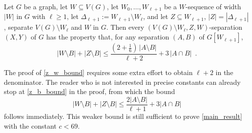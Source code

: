 \documentclass{patmorin}
\newcommand{\pat}[1]{\textcolor{Blue}{[Pat: #1]}}
\begin{document}
\begin{lem}\label{z_w_bound}
  Let $G$ be a graph, let $W\subseteq V(G)$, let $W_0,\ldots,W_{\ell+1}$ be a $W$-sequence of width $|W|$ in $G$ with $\ell\ge 1$, let $\Delta_{\ell+1}:=W_{\ell+1}\setminus W_{\ell}$,  and let $Z\subseteq W_{\ell+1}$, $|Z|=|\Delta_{\ell+1}|$, separate $V(G)\setminus W_{\ell}$ and $W$ in $G$.
  Then every $(V(G)\setminus W_{\ell},Z,W)$-separation $(X,Y)$ of $G$ has the property that, for any separation
  $(A,B)$ of $G[W_{\ell+1}]$,
  \[
    |W\setminus B|+|Z\setminus B|\le \frac{(2+\tfrac{1}{6})\,|A\setminus B|}{\ell+2}+3\,|A\cap B| \enspace .
  \]
\end{lem}


\begin{rem}\label{easier_path}
  The proof of \cref{z_w_bound} requires some extra effort to obtain $\ell+2$ in the denominator. The reader who is not interested in precise constants can already stop at \cref{z_b_bound} in the proof, from which the bound
  \[
    |W\setminus B|+|Z\setminus B|\le \frac{2|A\setminus B|}{\ell+1} + 3|A\cap B|
  \]
  follows immediately.
  This weaker bound is still sufficient to prove \cref{main_result} with the constant $c< 69$.
\end{rem}
\end{document}
